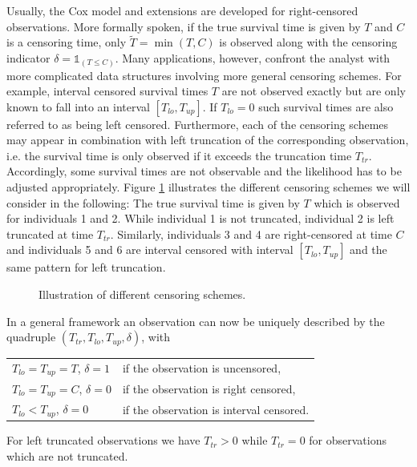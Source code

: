 \documentclass[11pt,a4paper,twoside]{bayesxarticle}
\begin{document}
Usually, the Cox model and extensions are developed for
right-censored observations. More formally spoken, if the true
survival time is given by $T$ and $C$ is a censoring time, only
$\tilde{T}=\min(T,C)$ is observed along with the censoring indicator
$\delta=\mathds{1}_{(T\le C)}$. Many applications, however, confront
the analyst with more complicated data structures involving more
general censoring schemes. For example, interval censored survival
times $T$ are not observed exactly but are only known to fall into
an interval $[T_{lo},T_{up}]$. If $T_{lo}=0$ such survival times are
also referred to as being left censored. Furthermore, each of the
censoring schemes may appear in combination with left truncation of
the corresponding observation, i.e. the survival time is only
observed if it exceeds the truncation time $T_{tr}$. Accordingly,
some survival times are not observable and the likelihood has to be
adjusted appropriately. Figure \ref{censoringschemes} illustrates
the different censoring schemes we will consider in the following:
The true survival time is given by $T$ which is observed for
individuals 1 and 2. While individual 1 is not truncated, individual
2 is left truncated at time $T_{tr}$. Similarly, individuals 3 and 4
are right-censored at time $C$ and individuals 5 and 6 are interval
censored with interval $[T_{lo},T_{up}]$ and the same pattern for
left truncation.

\begin{figure}[htb]
\begin{center}
{\it\caption{Illustration of different censoring
schemes.\label{censoringschemes}}}
\end{center}
\end{figure}

In a general framework an observation can now be uniquely described
 by the quadruple $(T_{tr},T_{lo},T_{up},\delta)$, with
\begin{center}
\begin{tabular}{ll}
$T_{lo}=T_{up}=T$, $\delta=1$ & if the observation is uncensored,\\
$T_{lo}=T_{up}=C$, $\delta=0$ & if the observation is right censored,\\
$T_{lo}<T_{up}$, $\delta=0$ & if the observation is interval censored.\\
\end{tabular}
\end{center}
For left truncated observations we have $T_{tr}>0$ while $T_{tr}=0$
for observations which are not truncated.
\end{document}
